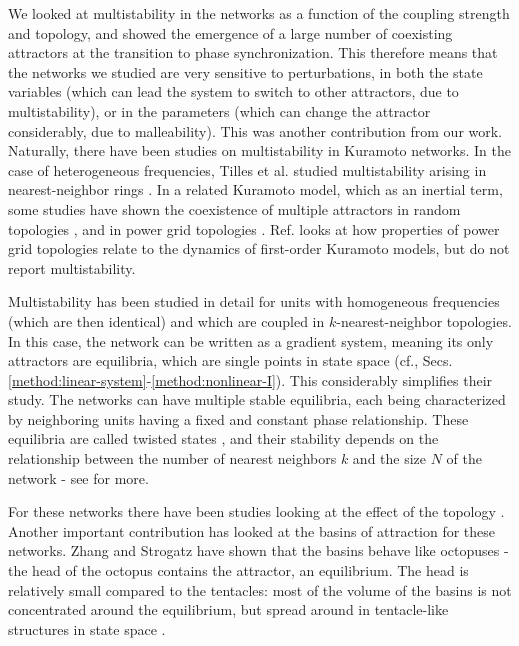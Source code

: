 We looked at multistability in the networks as a function of the coupling strength and topology, and showed the emergence of a large number of coexisting attractors at the transition to phase synchronization. This therefore means that the networks we studied are very sensitive to perturbations, in both the state variables (which can lead the system to switch to other attractors, due to multistability), or in the parameters (which can change the attractor considerably, due to malleability). This was another contribution from our work. Naturally, there have been studies on multistability in Kuramoto networks. In the case of heterogeneous frequencies, Tilles et al. studied multistability arising in nearest-neighbor rings \cite{tilles2011multistable}. In a related Kuramoto model, which as an inertial term, some studies have shown the coexistence of multiple attractors in random topologies \cite{gelbrecht2020monte}, and in power grid topologies \cite{hellmann2020network, halekotte2021transient}. Ref. \cite{potratzki2024synchronization} looks at how properties of power grid topologies relate to the dynamics of first-order Kuramoto models, but do not report multistability.

Multistability has been studied in detail for units with homogeneous frequencies (which are then identical) and which are coupled in $k$-nearest-neighbor topologies. In this case, the network can be written as a gradient system, meaning its only attractors are equilibria, which are single points in state space (cf., Secs. \ref{method:linear-system}-\ref{method:nonlinear-I}). This considerably simplifies their study. The networks can have multiple stable equilibria, each being characterized by neighboring units having a fixed and constant phase relationship. These equilibria are called twisted states \cite{wiley2006the}, and their stability depends on the relationship between the number of nearest neighbors $k$ and the size $N$ of the network \cite{wiley2006the} - see  for more.

For these networks there have been studies looking at the effect of the topology \cite{townsend2020dense}. Another important contribution has looked at the basins of attraction for these networks. Zhang and Strogatz have shown that the basins behave like octopuses - the head of the octopus contains the attractor, an equilibrium. The head is relatively small compared to the tentacles: most of the volume of the basins is not concentrated around the equilibrium, but spread around in tentacle-like structures in state space \cite{zhang2021basins}. 


